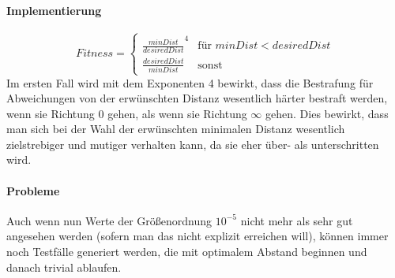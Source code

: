 \documentclass[12pt,a4paper]{scrartcl}
\begin{document}
\begin{enumerate}
	\paragraph{Implementierung}
	\begin{equation}
	Fitness = 
	\begin{cases}
		\frac{minDist}{desiredDist}^4 & \text{für } minDist < desiredDist \\
		\frac{desiredDist}{minDist} & \text{sonst}
	\end{cases}
	\end{equation}
	Im ersten Fall wird mit dem Exponenten 4 bewirkt, dass die Bestrafung für Abweichungen von der erwünschten Distanz wesentlich härter bestraft werden, wenn sie Richtung 0 gehen, als wenn sie Richtung $\infty$ gehen. Dies bewirkt, dass man sich bei der Wahl der erwünschten minimalen Distanz wesentlich zielstrebiger und mutiger verhalten kann, da sie eher über- als unterschritten wird.
	\paragraph{Probleme} Auch wenn nun Werte der Größenordnung $10^{-5}$ nicht mehr als sehr gut angesehen werden (sofern man das nicht explizit erreichen will), können immer noch Testfälle generiert werden, die mit optimalem Abstand beginnen und danach trivial ablaufen.
\end{enumerate} 
\end{document}
